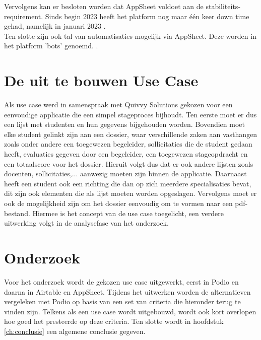 Vervolgens kan er besloten worden dat AppSheet voldoet aan de stabiliteits-requirement. Sinds begin 2023 heeft het platform nog maar één keer down time gehad, namelijk in januari 2023 \autocite{AppSheetStatus}. \\

Ten slotte zijn ook tal van automatisaties mogelijk via AppSheet. Deze worden in het platform 'bots' genoemd. \autocite{Wong2021}. \\


\section{De uit te bouwen Use Case}

Als use case werd in samenspraak met Quivvy Solutions gekozen voor een eenvoudige applicatie die een simpel stageproces bijhoudt. Ten eerste moet er dus een lijst met studenten en hun gegevens bijgehouden worden. Bovendien moet elke student gelinkt zijn aan een dossier, waar verschillende zaken aan vasthangen zoals onder andere een toegewezen begeleider, sollicitaties die de student gedaan heeft, evaluaties gegeven door een begeleider, een toegewezen stageopdracht en een totaalscore voor het dossier. Hieruit volgt dus dat er ook andere lijsten zoals docenten, sollicitaties,$\ldots$ aanwezig moeten zijn binnen de applicatie. Daarnaast heeft een student ook een richting die dan op zich meerdere specialisaties bevat, dit zijn ook elementen die als lijst moeten worden opgeslagen. Vervolgens moet er ook de mogelijkheid zijn om het dossier eenvoudig om te vormen naar een pdf-bestand. Hiermee is het concept van de use case toegelicht, een verdere uitwerking volgt in de analysefase van het onderzoek. \\

\section{Onderzoek} 

Voor het onderzoek wordt de gekozen use case uitgewerkt, eerst in Podio en daarna in Airtable en AppSheet. Tijdens het uitwerken worden de alternatieven vergeleken met Podio op basis van een set van criteria die hieronder terug te vinden zijn. Telkens als een use case wordt uitgebouwd, wordt ook kort overlopen hoe goed het presteerde op deze criteria. Ten slotte wordt in hoofdstuk \ref{ch:conclusie} een algemene conclusie gegeven. \\

